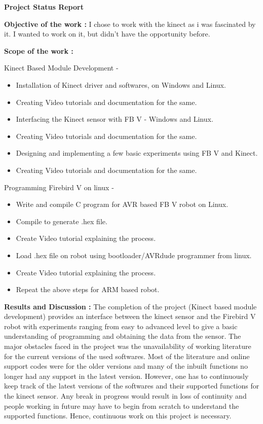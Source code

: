 \documentclass[20pt]{report}
\begin{document}
\vspace{0.5in}

\hspace{2.5in}
\textbf{Project Status Report}
\medskip

\textbf{Objective of the work : }
I chose to work with the kinect as i was fascinated by it. I wanted to work on it, but didn't have the opportunity before.

\medskip

\textbf{Scope of the work : }

Kinect Based Module Development -
\begin{itemize}


\item Installation of Kinect driver and softwares, on Windows and Linux.
\item Creating Video tutorials and documentation for the same.
\item Interfacing the Kinect sensor with FB V - Windows and Linux.
\item Creating Video tutorials and documentation for the same.
\item Designing and implementing a few basic experiments using FB V and Kinect.
\item Creating Video tutorials and documentation for the same.
\end{itemize}

Programming Firebird V on linux - 
\begin{itemize}


\item Write and compile C program for AVR based FB V robot on Linux.
\item Compile to generate .hex file.
\item Create Video tutorial explaining the process.
\item Load .hex file on robot using bootloader/AVRdude programmer from linux.
\item Create Video tutorial explaining the process.
\item Repeat the above steps for ARM based robot.
\end{itemize}

\medskip

\textbf{Results and Discussion : }
The completion of the project (Kinect based module development) provides an interface between the kinect sensor and the Firebird V robot with experiments ranging from easy to advanced level to give a basic understanding of programming and obtaining the data from the sensor. The major obstacles faced in the project was the unavailability of working literature for the current versions of  the used softwares. Most of the literature and online support codes were for the older versions and many of the inbuilt functions no longer had any support in the latest version.
However, one has to continuously keep track of the latest versions of the softwares and their supported functions for the kinect sensor. Any break in progress would result in loss of continuity and people working in future may have to begin from scratch to understand the supported functions. Hence, continuous work on this project is necessary.
\end{document}
